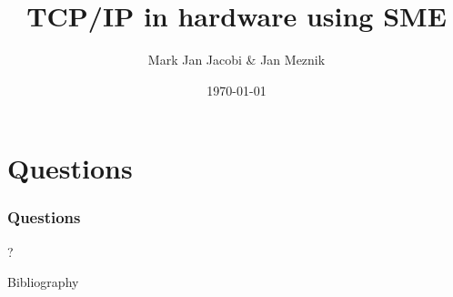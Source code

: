 \documentclass{beamer}
\title{TCP/IP in hardware using SME}
\author{Mark Jan Jacobi \& Jan Meznik}
\institute{University of Copenhagen}
\date{\today}
\begin{document}
\frame{\titlepage}
















\section{Questions}
\begin{frame}
  \frametitle{Questions}
  \begin{center}
    ?
  \end{center}
\end{frame}

\begin{frame}{Bibliography}


\end{frame}



\end{document}
